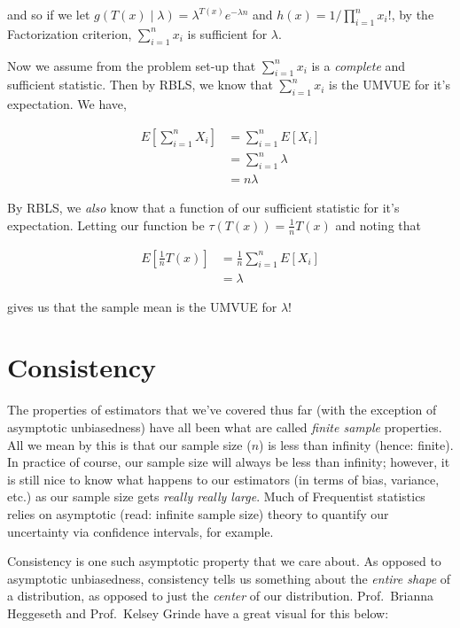 \documentclass[
  letterpaper,
  DIV=11,
  numbers=noendperiod]{scrreprt}
\begin{document}
and so if we let
\(g(T(x) \mid \lambda) = \lambda^{T(x)} e^{-\lambda n}\) and
\(h(x) = 1/\prod_{i = 1}^n x_i!\), by the Factorization criterion,
\(\sum_{i = 1}^n x_i\) is sufficient for \(\lambda\).

Now we assume from the problem set-up that \(\sum_{i = 1}^n x_i\) is a
\emph{complete} and sufficient statistic. Then by RBLS, we know that
\(\sum_{i = 1}^n x_i\) is the UMVUE for it's expectation. We have,

\begin{align*}
    E\left[\sum_{i = 1}^n X_i\right] & = \sum_{i = 1}^n E[X_i] \\
    & = \sum_{i = 1}^n \lambda \\
    & = n \lambda
\end{align*}

By RBLS, we \textit{also} know that a function of our sufficient
statistic for it's expectation. Letting our function be
\(\tau(T(x)) = \frac{1}{n}T(x)\) and noting that

\begin{align*}
    E\left[\frac{1}{n}T(x)\right] & = \frac{1}{n} \sum_{i = 1}^n E[X_i]\\
    & = \lambda
\end{align*}

gives us that the sample mean is the UMVUE for \(\lambda\)!


\chapter{Consistency}\label{consistency}

The properties of estimators that we've covered thus far (with the
exception of asymptotic unbiasedness) have all been what are called
\emph{finite sample} properties. All we mean by this is that our sample
size (\(n\)) is less than infinity (hence: finite). In practice of
course, our sample size will always be less than infinity; however, it
is still nice to know what happens to our estimators (in terms of bias,
variance, etc.) as our sample size gets \emph{really really large}. Much
of Frequentist statistics relies on asymptotic (read: infinite sample
size) theory to quantify our uncertainty via confidence intervals, for
example.

Consistency is one such asymptotic property that we care about. As
opposed to asymptotic unbiasedness, consistency tells us something about
the \emph{entire shape} of a distribution, as opposed to just the
\emph{center} of our distribution. Prof.~Brianna Heggeseth and
Prof.~Kelsey Grinde have a great visual for this below:
\end{document}
